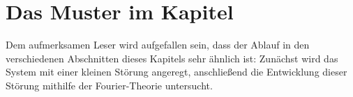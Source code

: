 %
%
%
%




\section{Das Muster im Kapitel}

Dem aufmerksamen Leser wird aufgefallen sein, dass der Ablauf in den verschiedenen Abschnitten dieses Kapitels sehr ähnlich ist:  
Zunächst wird das System mit einer kleinen Störung angeregt, anschließend die Entwicklung dieser Störung mithilfe der Fourier-Theorie untersucht.

